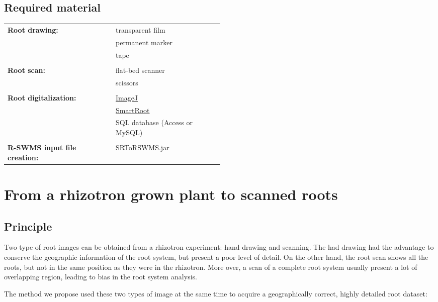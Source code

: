\documentclass[a4paper,english,10pt]{report}
\begin{document}
\section{Required material}

\begin{table}[htdp]
\begin{tabular}{p{0.5\linewidth}l}
\textbf{Root drawing:} & transparent film \\
& permanent marker \\
& tape \\ \\ 
\textbf{Root scan:} & flat-bed scanner \\
& scissors \\ \\ 
\textbf{Root digitalization:} & \href{http://rsb.info.nih.gov/ij/index.html}{ImageJ} \\
& \href{http://www.uclouvain.be/en-smartroot}{SmartRoot} \\
& SQL database (Access or MySQL) \\ \\ 
\textbf{R-SWMS input file creation:} & SRToRSWMS.jar \\
\end{tabular}
\end{table}%


\chapter{From a rhizotron grown plant to scanned roots}

\section{Principle}

Two type of root images can be obtained from a rhizotron experiment: hand drawing and scanning. The had drawing had the advantage to conserve the geographic information of the root system, but present a poor level of detail. On the other hand, the root scan shows all the roots, but not in the same position as they were in the rhizotron. More over, a scan of a complete root system usually present a lot of overlapping region, leading to bias in the root system analysis.

The method we propose used these two types of image at the same time to acquire a geographically correct, highly detailed root dataset:
\end{document}
